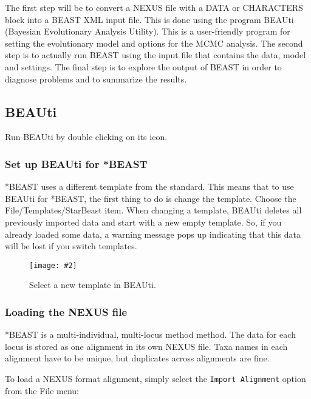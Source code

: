 \documentclass{article}
\newcommand{\includeimage}[2][]{%
\texttt{[image: \#2]}
}
\begin{document}
The first step will be to convert a NEXUS file with a DATA or CHARACTERS block into a BEAST XML input file. This is done using the program BEAUti (Bayesian Evolutionary Analysis Utility). This is a user-friendly program for setting the evolutionary model and options for the MCMC analysis. The second step is to actually run BEAST using the input file that contains the data, model and settings. The final step is to explore the output of BEAST in order to diagnose problems and to summarize the results.

\subsection*{BEAUti}

Run BEAUti by double clicking on its icon. 

\subsubsection*{Set up BEAUti for *BEAST}

*BEAST uses a different template from the standard. This means that to use BEAUti for *BEAST, the first thing to do is change the template. Choose the File/Templates/StarBeast item. When changing a template, BEAUti deletes all previously imported data and start with a new empty template. So, if you already loaded some data, a warning message pops up indicating that this data will be lost if you switch templates.

\begin{figure}
\centering
\includeimage[scale=0.4,clip=true,trim=0 300 200 0]{figures/BEAUti_selectTemplate}

\caption{\label{fig.template} Select a new template in BEAUti.}
\end{figure}


\def\mlstname{*BEAST}

\subsubsection*{Loading the NEXUS file }

\mlstname{} is a multi-individual, multi-locus method method. The data for each
locus is stored as one alignment in its own NEXUS file. Taxa names in each
alignment have to be unique, but duplicates across alignments are fine.

To load a NEXUS format alignment, simply select the \texttt{Import
Alignment} option from the File menu: 
\end{document}
